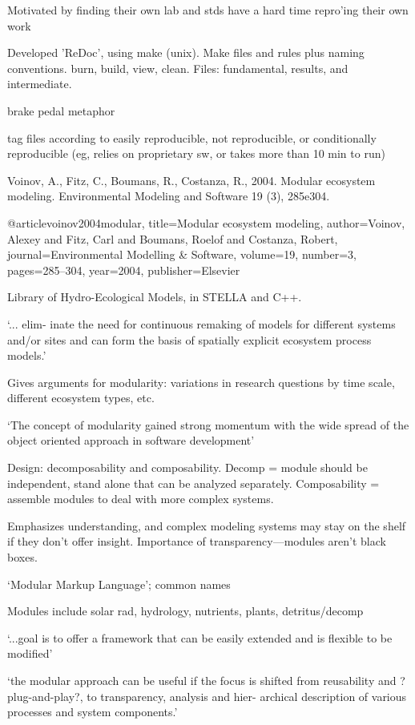 \documentclass[12pt]{amsart}
\begin{document}
Motivated by finding their own lab and stds have a hard time repro'ing their own work

Developed 'ReDoc', using make (unix). Make files and rules plus naming conventions. burn, build, view, clean. Files: fundamental, results, and intermediate.

brake pedal metaphor

tag files according to easily reproducible, not reproducible, or conditionally reproducible (eg, relies on proprietary sw, or takes more than 10 min to run)




Voinov, A., Fitz, C., Boumans, R., Costanza, R., 2004. Modular ecosystem modeling.
Environmental Modeling and Software 19 (3), 285e304.

@article{voinov2004modular,
  title={Modular ecosystem modeling},
  author={Voinov, Alexey and Fitz, Carl and Boumans, Roelof and Costanza, Robert},
  journal={Environmental Modelling \& Software},
  volume={19},
  number={3},
  pages={285--304},
  year={2004},
  publisher={Elsevier}
}


Library of Hydro-Ecological Models, in STELLA and C++.

`... elim- inate the need for continuous remaking of models for different systems and/or sites and can form the basis of spatially explicit ecosystem process models.'

Gives arguments for modularity: variations in research questions by time scale, different ecosystem types, etc.

`The concept of modularity gained strong momentum with the wide spread of the object oriented approach in software development'

Design: decomposability and composability. Decomp = module should be independent, stand alone that can be analyzed separately. Composability = assemble modules to deal with more complex systems.

Emphasizes understanding, and complex modeling systems may stay on the shelf if they don't offer insight. Importance of transparency---modules aren't black boxes.

`Modular Markup Language'; common names

Modules include solar rad, hydrology, nutrients, plants, detritus/decomp

`...goal is to offer a framework that can be easily extended and is flexible to be modified'

`the modular approach can be useful if the focus is shifted from reusability and ?plug-and-play?, to transparency, analysis and hier- archical description of various processes and system components.'
\end{document}
